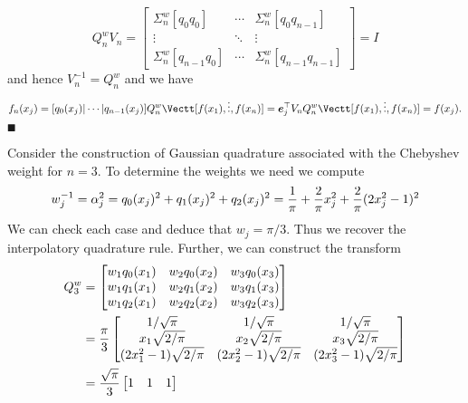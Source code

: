 \[
Q_n^w V_n = \begin{bmatrix} \ensuremath{\Sigma}_n^w[q_0 q_0] & \ensuremath{\cdots} & \ensuremath{\Sigma}_n^w[q_0 q_{n-1}]\\
                \ensuremath{\vdots} & \ensuremath{\ddots} & \ensuremath{\vdots} \\
                \ensuremath{\Sigma}_n^w[q_{n-1} q_0] & \ensuremath{\cdots} & \ensuremath{\Sigma}_n^w[q_{n-1} q_{n-1}]
                \end{bmatrix} = I
\]
and hence $V_n^{-1} = Q_n^w$ and we have
\[
f_n(x_j) = [q_0(x_j) | \ensuremath{\cdots} | q_{n-1}(x_j)] Q_n^w \Vectt[f(x_1),\ensuremath{\vdots},f(x_n)] = \ensuremath{\bm{\e}}_j^\ensuremath{\top} V_n  Q_n^w \Vectt[f(x_1),\ensuremath{\vdots},f(x_n)] = f(x_j).
\]
\ensuremath{\QED}

\begin{example}  Consider the construction of Gaussian quadrature associated with the Chebyshev weight for $n = 3$.  To determine the weights we need we compute
\[
w_j^{-1} = \ensuremath{\alpha}_j^2 = q_0(x_j)^2 + q_1(x_j)^2 + q_2(x_j)^2 = 
{1 \over \ensuremath{\pi}} + {2 \over \ensuremath{\pi}} x_j^2 + {2 \over \ensuremath{\pi}} (2x_j^2-1)^2
\]
We can check each case and deduce that $w_j = \ensuremath{\pi}/3$. Thus we recover the interpolatory quadrature rule. Further, we can construct the transform
\begin{align*}
Q_3^w &= \begin{bmatrix}
w_1 q_0(x_1) & w_2 q_0(x_2) & w_3 q_0(x_3) \\
w_1 q_1(x_1) & w_2 q_1(x_2) & w_3 q_1(x_3) \\
w_1 q_2(x_1) & w_2 q_2(x_2) & w_3 q_2(x_3) 
\end{bmatrix}\\
&= {\ensuremath{\pi} \over 3} \begin{bmatrix} 1/\sqrt{\ensuremath{\pi}} & 1/\sqrt{\ensuremath{\pi}} & 1/\sqrt{\ensuremath{\pi}} \\
                                x_1\sqrt{2/\ensuremath{\pi}} & x_2\sqrt{2/\ensuremath{\pi}} & x_3\sqrt{2/\ensuremath{\pi}} \\
                                (2x_1^2-1)\sqrt{2/\ensuremath{\pi}} &(2x_2^2-1)\sqrt{2/\ensuremath{\pi}} & (2x_3^2-1)\sqrt{2/\ensuremath{\pi}}
                                \end{bmatrix} \\
                                &= 
                                {\sqrt{\ensuremath{\pi}} \over 3} \begin{bmatrix} 1 & 1 & 1 \\

\end{bmatrix}
\end{align*}
\end{example}
